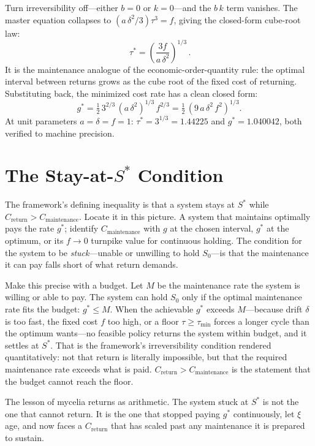 \documentclass[12pt]{article}
\begin{document}
Turn irreversibility off---either $b=0$ or $k=0$---and the $b\,k$ term vanishes. The master equation collapses to $(a\,\delta^2/3)\tau^3=f$, giving the closed-form cube-root law:
\begin{equation}
\boxed{\,\tau^*=\left(\frac{3f}{a\,\delta^2}\right)^{1/3}\,}.
\end{equation}
It is the maintenance analogue of the economic-order-quantity rule: the optimal interval between returns grows as the cube root of the fixed cost of returning. Substituting back, the minimized cost rate has a clean closed form:
\begin{equation}
g^*=\tfrac{1}{2}\,3^{2/3}\,(a\,\delta^2)^{1/3}\,f^{2/3}=\tfrac{1}{2}\,(9\,a\,\delta^2\,f^2)^{1/3}.
\end{equation}
At unit parameters $a=\delta=f=1$: $\tau^*=3^{1/3}=1.44225$ and $g^*=1.040042$, both verified to machine precision.

\section{The Stay-at-$S^*$ Condition}

The framework's defining inequality is that a system stays at $S^*$ while $C_{\text{return}}>C_{\text{maintenance}}$. Locate it in this picture. A system that maintains optimally pays the rate $g^*$; identify $C_{\text{maintenance}}$ with $g$ at the chosen interval, $g^*$ at the optimum, or its $f\to 0$ turnpike value for continuous holding. The condition for the system to be \emph{stuck}---unable or unwilling to hold $S_0$---is that the maintenance it can pay falls short of what return demands.

Make this precise with a budget. Let $M$ be the maintenance rate the system is willing or able to pay. The system can hold $S_0$ only if the optimal maintenance rate fits the budget: $g^*\le M$. When the achievable $g^*$ exceeds $M$---because drift $\delta$ is too fast, the fixed cost $f$ too high, or a floor $\tau\ge\tau_{\min}$ forces a longer cycle than the optimum wants---no feasible policy returns the system within budget, and it settles at $S^*$. That is the framework's irreversibility condition rendered quantitatively: not that return is literally impossible, but that the required maintenance rate exceeds what is paid. $C_{\text{return}}>C_{\text{maintenance}}$ is the statement that the budget cannot reach the floor.

The lesson of mycelia returns as arithmetic. The system stuck at $S^*$ is not the one that cannot return. It is the one that stopped paying $g^*$ continuously, let $\xi$ age, and now faces a $C_{\text{return}}$ that has scaled past any maintenance it is prepared to sustain.
\end{document}
